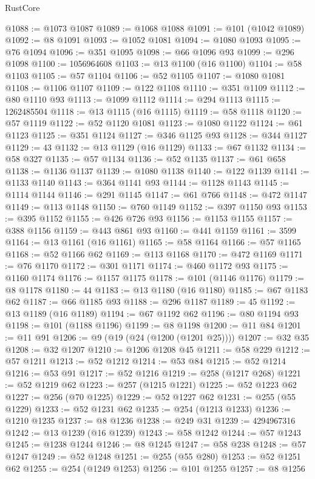 \begin{lexlean}{RustCore}
\begin{coremodule}
@1088 := @1073 @1087
@1089 := @1068 @1088
@1091 := @101 (@1042 @1089)
@1092 := @8 @1091
@1093 := @1052 @1081
@1094 := @1080 @1093
@1095 := @76 @1094
@1096 := @351 @1095
@1098 := @66 @1096 @93
@1099 := @296 @1098
@1100 := 1056964608
@1103 := @13 @1100 (@16 @1100)
@1104 := @58 @1103
@1105 := @57 @1104
@1106 := @52 @1105
@1107 := @1080 @1081
@1108 := @1106 @1107
@1109 := @122 @1108
@1110 := @351 @1109
@1112 := @80 @1110 @93
@1113 := @1099 @1112
@1114 := @294 @1113
@1115 := 1262485504
@1118 := @13 @1115 (@16 @1115)
@1119 := @58 @1118
@1120 := @57 @1119
@1122 := @52 @1120 @1081
@1123 := @1080 @1122
@1124 := @61 @1123
@1125 := @351 @1124
@1127 := @346 @1125 @93
@1128 := @344 @1127
@1129 := 43
@1132 := @13 @1129 (@16 @1129)
@1133 := @67 @1132
@1134 := @58 @327
@1135 := @57 @1134
@1136 := @52 @1135
@1137 := @61 @658
@1138 := @1136 @1137
@1139 := @1080 @1138
@1140 := @122 @1139
@1141 := @1133 @1140
@1143 := @364 @1141 @93
@1144 := @1128 @1143
@1145 := @1114 @1144
@1146 := @291 @1145
@1147 := @61 @766
@1148 := @472 @1147
@1149 := @113 @1148
@1150 := @760 @1149
@1152 := @397 @1150 @93
@1153 := @395 @1152
@1155 := @426 @726 @93
@1156 := @1153 @1155
@1157 := @388 @1156
@1159 := @443 @861 @93
@1160 := @441 @1159
@1161 := 3599
@1164 := @13 @1161 (@16 @1161)
@1165 := @58 @1164
@1166 := @57 @1165
@1168 := @52 @1166 @62
@1169 := @113 @1168
@1170 := @472 @1169
@1171 := @76 @1170
@1172 := @301 @1171
@1174 := @460 @1172 @93
@1175 := @1160 @1174
@1176 := @1157 @1175
@1178 := @101 (@1146 @1176)
@1179 := @8 @1178
@1180 := 44
@1183 := @13 @1180 (@16 @1180)
@1185 := @67 @1183 @62
@1187 := @66 @1185 @93
@1188 := @296 @1187
@1189 := 45
@1192 := @13 @1189 (@16 @1189)
@1194 := @67 @1192 @62
@1196 := @80 @1194 @93
@1198 := @101 (@1188 @1196)
@1199 := @8 @1198
@1200 := @11 @84
@1201 := @11 @91
@1206 := @9 (@19 (@24 (@1200 (@1201 @25))))
@1207 := @32 @35
@1208 := @32 @1207
@1210 := @1206 @1208 @45
@1211 := @58 @229
@1212 := @57 @1211
@1213 := @52 @1212
@1214 := @53 @84
@1215 := @52 @1214
@1216 := @53 @91
@1217 := @52 @1216
@1219 := @258 (@1217 @268)
@1221 := @52 @1219 @62
@1223 := @257 (@1215 @1221)
@1225 := @52 @1223 @62
@1227 := @256 (@70 @1225)
@1229 := @52 @1227 @62
@1231 := @255 (@55 @1229)
@1233 := @52 @1231 @62
@1235 := @254 (@1213 @1233)
@1236 := @1210 @1235
@1237 := @8 @1236
@1238 := @249 @31
@1239 := 4294967316
@1242 := @13 @1239 (@16 @1239)
@1243 := @58 @1242
@1244 := @57 @1243
@1245 := @1238 @1244
@1246 := @8 @1245
@1247 := @58 @238
@1248 := @57 @1247
@1249 := @52 @1248
@1251 := @255 (@55 @280)
@1253 := @52 @1251 @62
@1255 := @254 (@1249 @1253)
@1256 := @101 @1255
@1257 := @8 @1256

\end{coremodule}
\end{lexlean}
